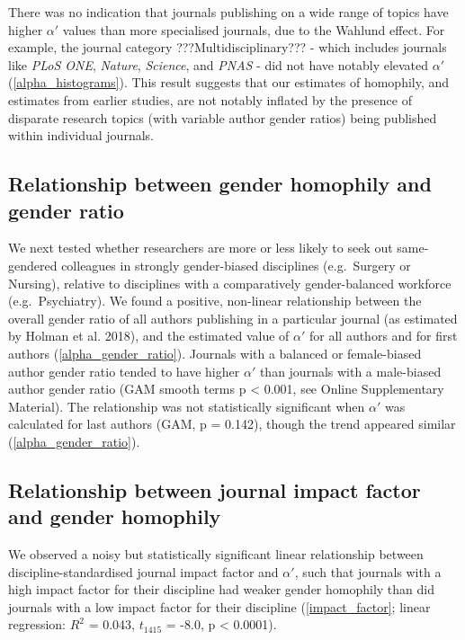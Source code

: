 \documentclass[12pt,]{article}
\begin{document}
There was no indication that journals publishing on a wide range of
topics have higher \(\alpha'\) values than more specialised journals,
due to the Wahlund effect. For example, the journal category
???Multidisciplinary??? - which includes journals like \emph{PLoS ONE},
\emph{Nature}, \emph{Science}, and \emph{PNAS} - did not have notably
elevated \(\alpha'\) (\autoref{alpha_histograms}). This result suggests
that our estimates of homophily, and estimates from earlier studies, are
not notably inflated by the presence of disparate research topics (with
variable author gender ratios) being published within individual
journals.

\subsection{Relationship between gender homophily and gender
ratio}\label{relationship-between-gender-homophily-and-gender-ratio}

We next tested whether researchers are more or less likely to seek out
same-gendered colleagues in strongly gender-biased disciplines
(e.g.~Surgery or Nursing), relative to disciplines with a comparatively
gender-balanced workforce (e.g.~Psychiatry). We found a positive,
non-linear relationship between the overall gender ratio of all authors
publishing in a particular journal (as estimated by Holman et al. 2018),
and the estimated value of \(\alpha'\) for all authors and for first
authors (\autoref{alpha_gender_ratio}). Journals with a balanced or
female-biased author gender ratio tended to have higher \(\alpha'\) than
journals with a male-biased author gender ratio (GAM smooth terms p
\textless{} 0.001, see Online Supplementary Material). The relationship
was not statistically significant when \(\alpha'\) was calculated for
last authors (GAM, p = 0.142), though the trend appeared similar
(\autoref{alpha_gender_ratio}).

\subsection{Relationship between journal impact factor and gender
homophily}\label{relationship-between-journal-impact-factor-and-gender-homophily}

We observed a noisy but statistically significant linear relationship
between discipline-standardised journal impact factor and \(\alpha'\),
such that journals with a high impact factor for their discipline had
weaker gender homophily than did journals with a low impact factor for
their discipline (\autoref{impact_factor}; linear regression: \(R^2\) =
0.043, \(t_{1415}\) = -8.0, p \textless{} 0.0001).
\end{document}
